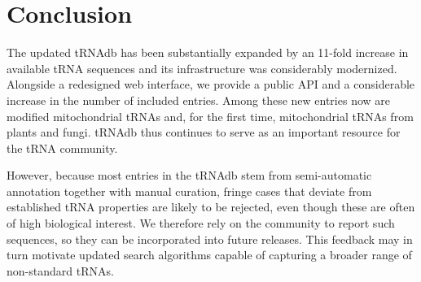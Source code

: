 \documentclass[unnumsec,webpdf,contemporary,large]{oup-authoring-template}
\newcommand{\TODO}[1]{\begingroup\color{red}#1\endgroup}
\begin{document}
%
%


\section{Conclusion}

The updated tRNAdb has been substantially expanded by an 11-fold increase in available tRNA sequences and its infrastructure was considerably modernized.
Alongside a redesigned web interface, we provide a public API and a considerable increase in the number of included entries. Among these new entries now are modified mitochondrial tRNAs and, for the first time, mitochondrial tRNAs from plants and fungi. tRNAdb thus continues to serve as an important resource for the tRNA community.

However, because most entries in the tRNAdb stem from semi-automatic annotation together with manual curation, fringe cases that deviate from established tRNA properties are likely
to be rejected, even though these are often of high biological interest. We therefore rely on the community to report such sequences, so they can be incorporated into future releases. This feedback may in turn motivate updated search algorithms capable of capturing a broader range of non-standard tRNAs.
\end{document}
